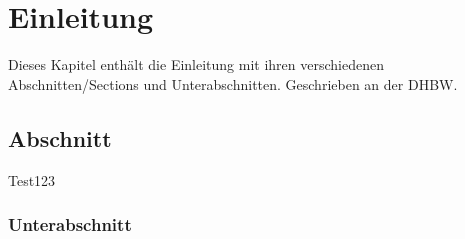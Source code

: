 \chapter{Einleitung}

Dieses Kapitel enthält die Einleitung mit ihren verschiedenen Abschnitten/Sections und
Unterabschnitten. Geschrieben an der \ac{DHBW}.

\section{Abschnitt}

Test123 \cite{ME12}

\subsection{Unterabschnitt}

\lipsum 